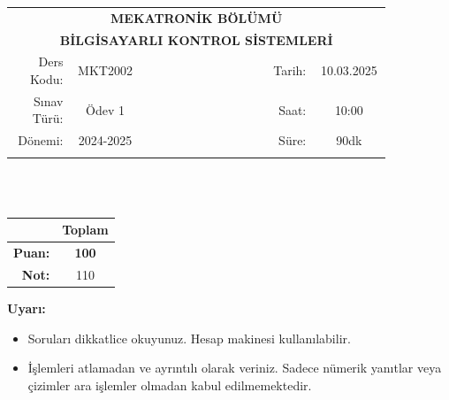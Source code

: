 \newcommand\UniversiteAdi{Niğde Ömer Halisdemir Üniversitesi}
\newcommand\BolumAdi{MEKATRONİK BÖLÜMÜ}
\newcommand\DersKodu{MKT2002}
\newcommand\DersAdi{BİLGİSAYARLI KONTROL SİSTEMLERİ}
\newcommand\SinavAdi{Ödev 1}
\newcommand\SinavTarihi{10.03.2025}
\newcommand\SinavSaati{10:00}
\newcommand\SinavSuresi{90dk}

\pagestyle{fancy}
\fancyhf{} %
\noindent
\begin{tabular}{
    p{0.15\linewidth}
    p{0.15\linewidth}
    p{0.3\linewidth}
    p{0.1\linewidth}
    p{0.15\linewidth}}
    \multicolumn{5}{c}{\textbf{\BolumAdi}}\\
    \multicolumn{5}{c}{\textbf{\DersAdi}}\\\hline
    \multicolumn{1}{|r|}{Ders Kodu:}&
    \multicolumn{1}{|c|}{\DersKodu}&
    \multicolumn{1}{|c|}{}& 
    \multicolumn{1}{|r|}{Tarih:}&
    \multicolumn{1}{|c|}{\SinavTarihi} \\\hline
    \multicolumn{1}{|r|}{Sınav Türü:}&
    \multicolumn{1}{|c|}{\SinavAdi}&  
    \multicolumn{1}{|c|}{}&
    \multicolumn{1}{|r|}{Saat:}&
    \multicolumn{1}{|c|}{\SinavSaati}\\\hline
    \multicolumn{1}{|r|}{Dönemi:}&
    \multicolumn{1}{|c|}{2024-2025}&
    \multicolumn{1}{|c|}{}&
    \multicolumn{1}{|r|}{Süre:}&
    \multicolumn{1}{|c|}{\SinavSuresi} \\\hline
    &&&&\\
\end{tabular}\\\\
\noindent\begin{center}
\begin{tabular}{|r|c|}\hline
    &\textbf{Toplam}\\\hline
    \textbf{Puan:} &\textbf{100}\\\hline
    \textbf{Not:}  &110\\\hline
\end{tabular}\end{center}
\noindent\textbf{Uyarı:}
\begin{itemize}\bfseries
    \item Soruları dikkatlice okuyunuz. Hesap makinesi kullanılabilir.
    \item İşlemleri atlamadan ve ayrıntılı olarak veriniz. Sadece nümerik yanıtlar veya çizimler ara işlemler olmadan kabul edilmemektedir.
\end{itemize}
